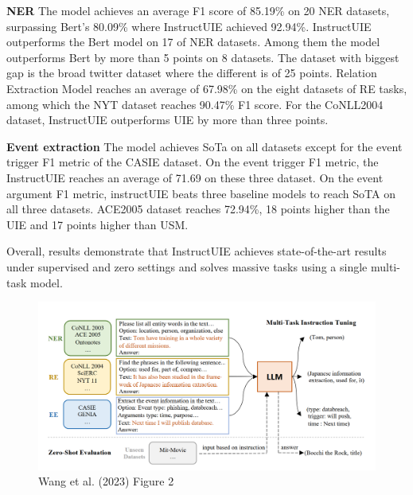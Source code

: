 \documentclass[twocolumn, 11pt]{extarticle}
\begin{document}
\textbf{NER}
The model achieves an average F1 score of 85.19\% on 20 NER datasets, surpassing Bert’s 80.09\% where InstructUIE achieved 92.94\%. InstructUIE outperforms the Bert model on 17 of NER datasets. Among them the model outperforms Bert by more than 5 points on 8 datasets. The dataset with biggest gap is the broad twitter dataset where the different is of 25 points.
Relation Extraction
Model reaches an average of 67.98\% on the eight datasets of RE tasks, among which the NYT dataset reaches 90.47\% F1 score.
For the CoNLL2004 dataset, InstructUIE outperforms UIE by more than three points.

\textbf{Event extraction}
The model achieves SoTa on all datasets except for the event trigger F1 metric of the CASIE dataset. On the event trigger F1 metric, the InstructUIE reaches an average of 71.69 on these three dataset. On the event argument F1 metric, instructUIE beats three baseline models to reach SoTA on all three datasets. ACE2005 dataset reaches 72.94\%, 18 points higher than the UIE and 17 points higher than USM.

Overall, results demonstrate that InstructUIE achieves state-of-the-art results under supervised and zero settings and solves massive tasks using a single multi-task model.
\begin{figure}
    \centering
    \includegraphics[width=1\linewidth]{InstructUIE.png}
    \caption{Wang et al. (2023) Figure 2}
    \label{Instruct UIE }
\end{figure}
\end{document}
